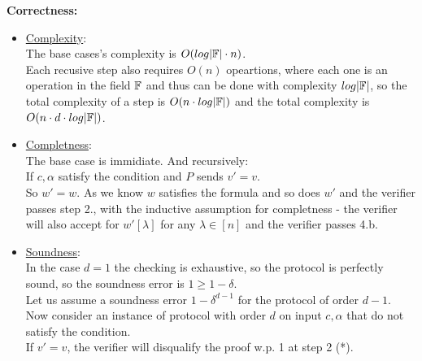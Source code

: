 \textbf{Correctness:}
\begin{itemize}
    \item \underline{Complexity}:\\
        The base cases's complexity is $O(log|\mathbb{F}|\cdot n)$.\\
        Each recusive step also requires $O(n)$ opeartions,
        where each one is an operation in the field $\mathbb{F}$ and thus can be done with
        complexity $log|\mathbb{F}|$, so the total complexity of a step is $O(n\cdot log|\mathbb{F}|)$
        and the total complexity is $O(n\cdot d\cdot log|\mathbb{F}|)$.\\
    \item \underline{Completness}:\\
        The base case is immidiate. And recursively:\\
        If $c, \alpha$ satisfy the condition and $P$ sends $v'=v$.\\
        So $w'=w$.
        As we know $w$ satisfies the formula and so does $w'$ and the verifier passes step 2.,
        with the inductive assumption for completness - the verifier will also
        accept for $w'[\lambda]$ for any $\lambda\in[n]$ and the verifier passes 4.b.\\
        
    \item \underline{Soundness}:\\
        In the case $d=1$ the checking is exhaustive, so the protocol is perfectly sound,
        so the soundness error is $1\geq 1-\delta$.\\
        
        Let us assume a soundness error $1-\delta^{d-1}$ for the protocol
        of order $d-1$.\\
        Now consider an instance of protocol with order $d$ on input $c,\alpha$ that do
        not satisfy the condition.\\

        If $v'=v$, the verifier will disqualify the proof w.p. 1 at step 2 (*).\\


\end{itemize}
